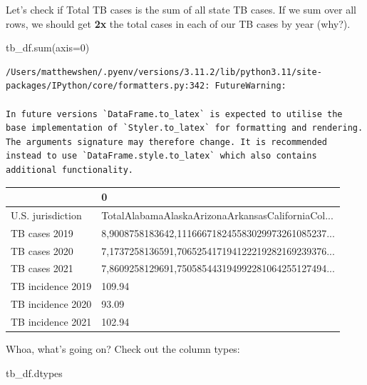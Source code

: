 \documentclass[
  letterpaper,
  DIV=11,
  numbers=noendperiod]{scrreprt}
\newenvironment{Shaded}{\begin{snugshade}}{\end{snugshade}}
\newcommand{\BuiltInTok}[1]{\textcolor[rgb]{0.00,0.23,0.31}{#1}}
\newcommand{\DecValTok}[1]{\textcolor[rgb]{0.68,0.00,0.00}{#1}}
\newcommand{\NormalTok}[1]{\textcolor[rgb]{0.00,0.23,0.31}{#1}}
\newcommand{\OperatorTok}[1]{\textcolor[rgb]{0.37,0.37,0.37}{#1}}
\begin{document}
Let's check if Total TB cases is the sum of all state TB cases. If we
sum over all rows, we should get \textbf{2x} the total cases in each of
our TB cases by year (why?).

\begin{Shaded}
\begin{Highlighting}[]
\NormalTok{tb\_df.}\BuiltInTok{sum}\NormalTok{(axis}\OperatorTok{=}\DecValTok{0}\NormalTok{)}
\end{Highlighting}
\end{Shaded}

\begin{verbatim}
/Users/matthewshen/.pyenv/versions/3.11.2/lib/python3.11/site-packages/IPython/core/formatters.py:342: FutureWarning:

In future versions `DataFrame.to_latex` is expected to utilise the base implementation of `Styler.to_latex` for formatting and rendering. The arguments signature may therefore change. It is recommended instead to use `DataFrame.style.to_latex` which also contains additional functionality.
\end{verbatim}

\begin{tabular}{ll}
\toprule
{} &                                                  0 \\
\midrule
U.S. jurisdiction &  TotalAlabamaAlaskaArizonaArkansasCaliforniaCol... \\
TB cases 2019     &  8,9008758183642,111666718245583029973261085237... \\
TB cases 2020     &  7,1737258136591,706525417194122219282169239376... \\
TB cases 2021     &  7,8609258129691,750585443194992281064255127494... \\
TB incidence 2019 &                                             109.94 \\
TB incidence 2020 &                                              93.09 \\
TB incidence 2021 &                                             102.94 \\
\bottomrule
\end{tabular}

Whoa, what's going on? Check out the column types:

\begin{Shaded}
\begin{Highlighting}[]
\NormalTok{tb\_df.dtypes}
\end{Highlighting}
\end{Shaded}
\end{document}
